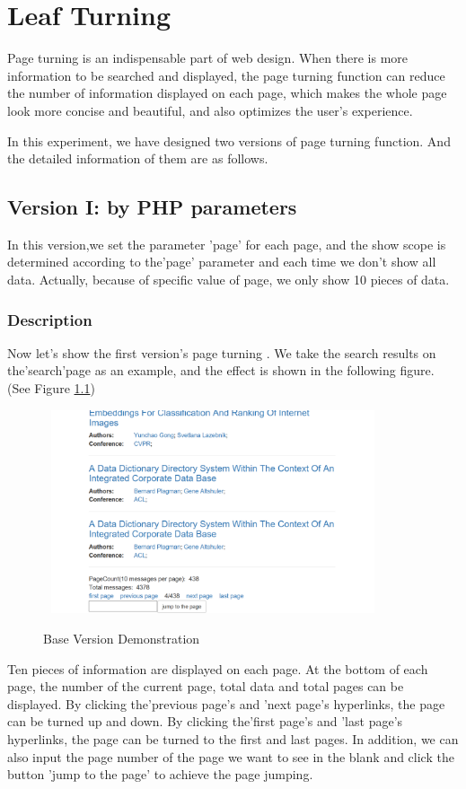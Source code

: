 \documentclass{book}
\begin{document}
\chapter{Leaf Turning}

Page turning is an indispensable part of web design. When there is more information to be searched and displayed, the page turning function can reduce the number of information displayed on each page, which makes the whole page look more concise and beautiful, and also optimizes the user's experience.

In this experiment, we have designed two versions of page turning function. And the detailed information of them are as follows.

\section{Version I: by PHP parameters}
In this version,we set the parameter 'page' for each page, and the show scope is determined according to the'page' parameter and each time we don't show all data. Actually, because of specific value of page, we only show 10 pieces of data.
\subsection{Description}
Now let's show the first version's page turning . We take the search results on the'search'page as an example, and the effect is shown in the following figure.
(See Figure \ref{fig:dsw1})

\begin{figure}[h]
\centering
\includegraphics[height=6.0cm,width=10.0cm]{img/dsw_11.png}
\label{fig:dsw1}
\caption{Base Version Demonstration}

\end{figure}
Ten pieces of information are displayed on each page. At the bottom of each page, the number of the current page, total data and total pages can be displayed. By clicking the'previous page's and 'next page's hyperlinks, the page can be turned up and down. By clicking the'first page's and 'last page's hyperlinks, the page can be turned to the first and last pages. In addition, we can also input the page number of the page we want to see in the blank and click the button 'jump to the page' to achieve the page jumping.
\end{document}
